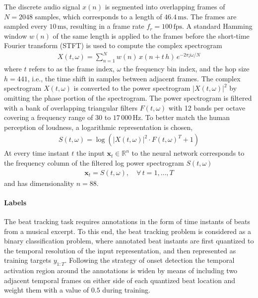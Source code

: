 \documentclass{scrartcl}
\begin{document}
The discrete audio signal $x(n)$ is segmented into overlapping frames of $N = 2048$ samples, which corresponds to a length of $46.4 \,\text{ms}$. The frames are sampled every $10 \,\text{ms}$, resulting in a frame rate $f_r = 100 \,\text{fps}$. A standard Hamming window $w(n)$ of the same length is applied to the frames before the short-time Fourier transform (STFT) is used to compute the complex spectrogram 
\begin{align}
X(t,\omega) = \sum_{n = 1}^{N} w(n) \, x(n + t\,h) \, e^{-2 \pi j \omega /N}
\end{align} 
where $t$ refers to as the frame index, $\omega$ the frequency bin index, and the hop size $h=441$, i.e., the time shift in samples between adjacent frames. The complex spectrogram $X(t,\omega)$ is converted to the power spectrogram $|X(t,\omega)|^2$ by omitting the phase portion of the spectrogram. The power spectrogram is filtered with a bank of overlapping triangular filters $F(t,\omega)$ with 12 bands per octave covering a frequency range of $30$ to $17\,000 \, \text{Hz}$. To better match the human perception of loudness, a logarithmic representation is chosen, 
\begin{align}
S(t,\omega) = \log \left( |X(t,\omega)|^2 \cdot F(t,\omega)^T + 1 \right)
\end{align} 
At every time instant $t$ the input  $\mathbf x_t \in \mathbb R^n$ to the neural network corresponds to the frequency column of the filtered log power spectrogram $S(t,\omega)$
\begin{align}
\mathbf x_t = S(t,\omega), \quad \forall\, t= 1,\dots,T
\end{align} 
and has dimensionality $n=88$.


\paragraph{Labels}
The beat tracking task requires annotations in the form of time instants of beats from a musical excerpt. To this end, the beat tracking problem is considered as a binary classification problem, where annotated beat instants are first quantized to the temporal resolution of the input representation, and then represented as training targets $y_{1:T}$. Following the strategy of onset detection \cite{Schluter2014} the temporal activation region around the annotations is widen by means of including two adjacent temporal frames on either side of each quantized beat location and weight them with a value of $0.5$ during training. 
\end{document}
